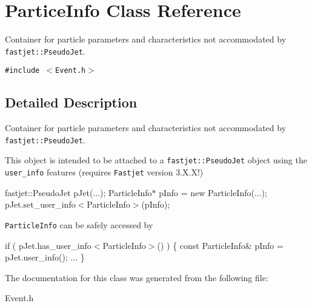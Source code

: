 \hypertarget{classParticeInfo}{
\section{Partice\-Info Class Reference}
\label{classParticeInfo}
}
Container for particle parameters and characteristics not accommodated by {\tt fastjet::Pseudo\-Jet}.  


{\tt \#include $<$Event.h$>$}



\subsection{Detailed Description}
Container for particle parameters and characteristics not accommodated by {\tt fastjet::Pseudo\-Jet}. 

This object is intended to be attached to a {\tt fastjet::Pseudo\-Jet} object using the {\tt user\_\-info} features (requires {\tt Fastjet} version 3.X.X!)

fastjet::Pseudo\-Jet p\-Jet(...); Particle\-Info$\ast$ p\-Info = new Particle\-Info(...); p\-Jet.set\_\-user\_\-info$<$Particle\-Info$>$(p\-Info);

{\tt Particle\-Info} can be safely accessed by

if ( p\-Jet.has\_\-user\_\-info$<$Particle\-Info$>$() ) \{ const Particle\-Info\& p\-Info = p\-Jet.user\_\-info(); ... \} 



The documentation for this class was generated from the following file:\begin{CompactItemize}
\item 
Event.h\end{CompactItemize}
